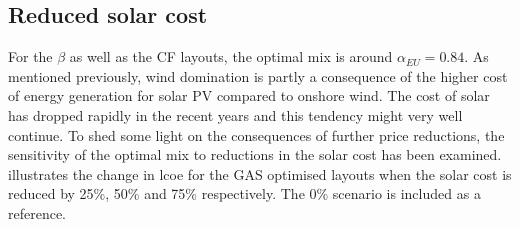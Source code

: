 \documentclass[a4paper, 5p, sort&compress]{elsarticle}%
\begin{document}
%

\subsection{Reduced solar cost}
\label{sec:reduced-solar-cost}

For the $\beta$ as well as the CF layouts, the optimal mix is around
$\alpha_{EU}=0.84$. As mentioned previously, wind domination is partly a
consequence of the higher cost of energy generation for solar PV
compared to onshore wind. The cost of solar has dropped rapidly in the
recent years and this tendency might very well continue. To shed some
light on the consequences of further price reductions, the sensitivity
of the optimal mix to reductions in the solar cost has been
examined.  illustrates the change in \gls{lcoe} for the
GAS optimised layouts when the solar cost is reduced by 25\%, 50\% and
75\% respectively. The 0\% scenario is included as a reference.
\end{document}
